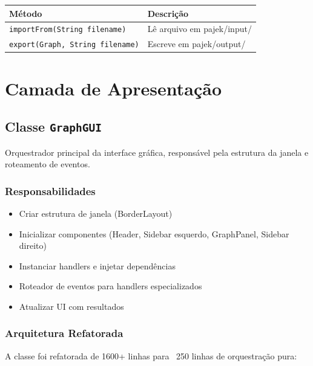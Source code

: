 \documentclass[12pt,a4paper]{article}
\begin{document}
\begin{table}[h]
\centering
\begin{tabular}{|l|l|}
\hline
\textbf{Método} & \textbf{Descrição} \\
\hline
\texttt{importFrom(String filename)} & Lê arquivo em pajek/input/ \\
\hline
\texttt{export(Graph, String filename)} & Escreve em pajek/output/ \\
\hline
\end{tabular}
\end{table}

\newpage

\section{Camada de Apresentação}

\subsection{Classe \texttt{GraphGUI}}

Orquestrador principal da interface gráfica, responsável pela estrutura da janela e roteamento de eventos.

\subsubsection{Responsabilidades}

\begin{itemize}
    \item Criar estrutura de janela (BorderLayout)
    \item Inicializar componentes (Header, Sidebar esquerdo, GraphPanel, Sidebar direito)
    \item Instanciar handlers e injetar dependências
    \item Roteador de eventos para handlers especializados
    \item Atualizar UI com resultados
\end{itemize}

\subsubsection{Arquitetura Refatorada}

A classe foi refatorada de 1600+ linhas para ~250 linhas de orquestração pura:
\end{document}
